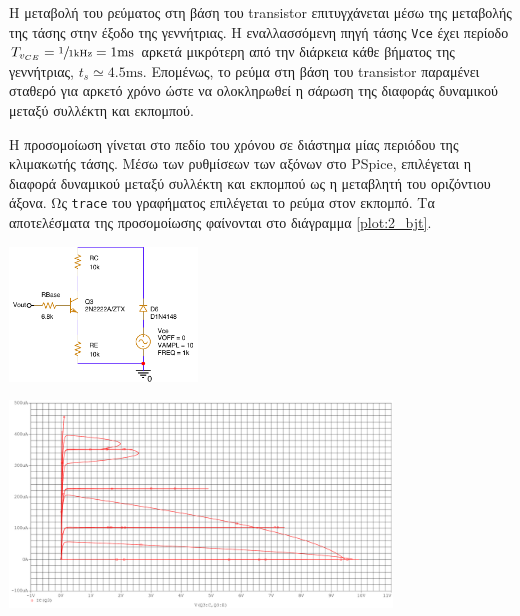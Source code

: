 \setlength{\columnsep}{2pt}
\setlength{\columnseprule}{0pt}
\begin{multicols}{2}
	Η μεταβολή του ρεύματος στη βάση του transistor επιτυγχάνεται μέσω της μεταβολής της τάσης στην έξοδο της γεννήτριας. Η εναλλασσόμενη πηγή τάσης \texttt{Vce} έχει περίοδο $T_{v_{CE}}=\sfrac{1}{1\unit{\kilo\hertz}}=1\unit{\milli\second}$ αρκετά μικρότερη από την διάρκεια κάθε βήματος της γεννήτριας, $t_s\simeq4.5\unit{\milli\second}$. Επομένως, το ρεύμα στη βάση του transistor παραμένει σταθερό για αρκετό χρόνο ώστε να ολοκληρωθεί η σάρωση της διαφοράς δυναμικού μεταξύ συλλέκτη και εκπομπού.\par
	Η προσομοίωση γίνεται στο πεδίο του χρόνου σε διάστημα μίας περιόδου της κλιμακωτής τάσης. Μέσω των ρυθμίσεων των αξόνων στο PSpice, επιλέγεται η διαφορά δυναμικού μεταξύ συλλέκτη και εκπομπού ως η μεταβλητή του οριζόντιου άξονα. Ως \texttt{trace} του γραφήματος επιλέγεται το ρεύμα στον εκπομπό. Τα αποτελέσματα της προσομοίωσης φαίνονται στο διάγραμμα \ref{plot:2_bjt}.\par
	\begin{center}
		\begin{circuitfig}[H]
			\centering
			\includegraphics[width=5cm]{spice_02/ask2_bjt_schematic.pdf}
			\caption{Κύκλωμα για τη λήψη των χαρακτηριστικών $v_{CE}-i_C$ ενός BJT. Το κύκλωμα συνδέεται στην έξοδο της γεννήτριας κλιμακωτής τάσης.}
			\label{circ:2_bjt_schematic}
		\end{circuitfig}
	\end{center}
\end{multicols}
\vspace*{-0.35cm}
\begin{plot_fig}[H]
	\begin{center}
		\includegraphics[height=5.5cm]{spice_02/q6.pdf}
		\caption{Χαρακτηριστικές $v_{CE}-i_C$. Οι \textsl{ενδιάμεσες} καμπύλες, μεταξύ των αναμενόμενων καμπυλών, οφείλονται στο γεγονός πως καθώς μεταβάλλεται η έξοδος της γεννήτριας η σάρωση της πηγής \texttt{Vce} του κυκλώματος \ref{circ:2_bjt_schematic} συνεχίζεται.}
		\label{plot:2_bjt}
	\end{center}
\end{plot_fig}